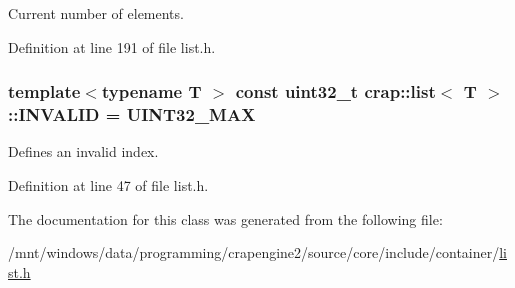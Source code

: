 Current number of elements. 



Definition at line 191 of file list.\+h.

\hypertarget{classcrap_1_1list_af6ca677970fb2d6f6f22b82d89e9b183}{
\subsubsection[{I\+N\+V\+A\+L\+I\+D}]{\setlength{\rightskip}{0pt plus 5cm}template$<$typename T $>$ const uint32\+\_\+t {\bf crap\+::list}$<$ T $>$\+::I\+N\+V\+A\+L\+I\+D = {\bf U\+I\+N\+T32\+\_\+\+M\+A\+X}\hspace{0.3cm}{\ttfamily [static]}}}\label{classcrap_1_1list_af6ca677970fb2d6f6f22b82d89e9b183}


Defines an invalid index. 



Definition at line 47 of file list.\+h.



The documentation for this class was generated from the following file\+:\begin{DoxyCompactItemize}
\item 
/mnt/windows/data/programming/crapengine2/source/core/include/container/\hyperlink{list_8h}{list.\+h}\end{DoxyCompactItemize}
